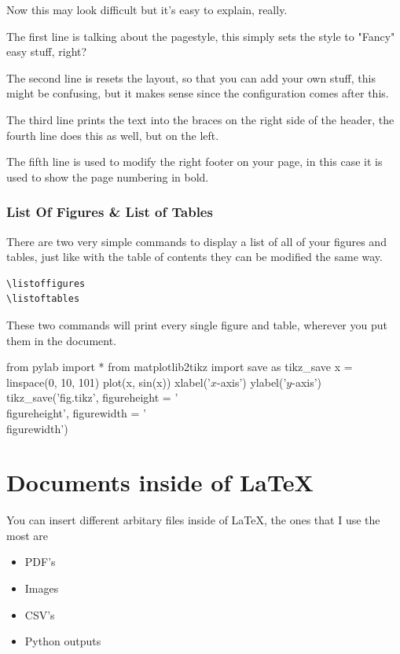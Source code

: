 \documentclass[12pt, letterpaper, oneside]{article} \usepackage[utf8]{inputenc}
\newlength\figureheight
\newlength\figurewidth
\begin{document}
Now this may look difficult but it's easy to explain, really.

The first line is talking about the pagestyle, this simply sets the style to "Fancy" easy stuff, right? 

The second line is resets the layout, so that you can add your own stuff, this might be confusing, but it makes sense since the configuration comes after this.

The third line prints the text into the braces on the right side of the header, the fourth line does this as well, but on the left.

The fifth line is used to modify the right footer on your page, in this case it is used to show the page numbering in bold.

\subsubsection{List Of Figures \& List of Tables}

There are two very simple commands to display a list of all of your figures and tables, just like with the table of contents they can be modified the same way.

\begin{lstlisting}
\listoffigures
\listoftables
\end{lstlisting}

These two commands will print every single figure and table, wherever you put them in the document. 



\begin{pycode}
from pylab import *
from matplotlib2tikz import save as tikz_save
x = linspace(0, 10, 101)
plot(x, sin(x))
xlabel('$x$-axis')
ylabel('$y$-axis')
tikz_save('fig.tikz',
       figureheight = '\\figureheight',
       figurewidth = '\\figurewidth')
\end{pycode}

\pagebreak

\section{Documents inside of \LaTeX{}}

You can insert different arbitary files inside of \LaTeX{}, the ones that I use the most are 

\begin{itemize}
	\item PDF's
	\item Images
	\item CSV's
	\item Python outputs
\end{itemize}
\end{document}
